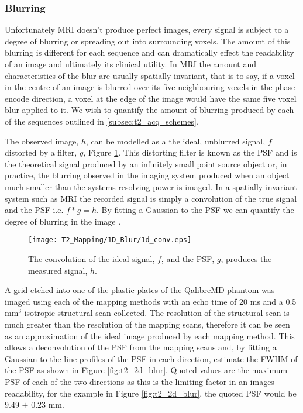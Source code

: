 \subsubsection{Blurring}
Unfortunately \ac{MRI} doesn't produce perfect images, every signal is subject to a degree of blurring or spreading out into surrounding voxels. The amount of this blurring is different for each sequence and can dramatically effect the readability of an image and ultimately its clinical utility. In \ac{MRI} the amount and characteristics of the blur are usually spatially invariant, that is to say, if a voxel in the centre of an image is blurred over its five neighbouring voxels in the phase encode direction, a voxel at the edge of the image would have the same five voxel blur applied to it. We wish to quantify the amount of blurring produced by each of the sequences outlined in \ref{subsec:t2_acq_schemes}.

The observed image, $h$, can be modelled as a the ideal, unblurred signal, $f$ distorted by a filter, $g$, Figure \ref{fig:t2_1d_blur}. This distorting filter is known as the \ac{PSF} and is the theoretical signal produced by an infinitely small point source object or, in practice, the blurring observed in the imaging system produced when an object much smaller than the systems resolving power is imaged. In a spatially invariant system such as \ac{MRI} the recorded signal is simply a convolution of the true signal and the \ac{PSF} i.e. $f \ast g = h$. By fitting a Gaussian to the \ac{PSF} we can quantify the degree of blurring in the image \cite{chaimow_more_2017, chaimow_more_2017-1}. 
\begin{figure}[H]
	\centering
	\texttt{[image: T2\_Mapping/1D\_Blur/1d\_conv.eps]}
	\caption{The convolution of the ideal signal, $f$, and the \ac{PSF}, $g$, produces the measured signal, $h$.}
	\label{fig:t2_1d_blur}	
\end{figure}

A grid etched into one of the plastic plates of the QalibreMD phantom was imaged using each of the \ttwo mapping methods with an echo time of 20 ms and a 0.5 mm$^3$ isotropic structural scan collected. The resolution of the structural scan is much greater than the resolution of the \ttwo mapping scans, therefore it can be seen as an approximation of the ideal image produced by each \ttwo mapping method. This allows a deconvolution of the \ac{PSF} from the \ttwo mapping scans and, by fitting a Gaussian to the line profiles of the \ac{PSF} in each direction, estimate the \ac{FWHM} of the \ac{PSF} as shown in Figure \ref{fig:t2_2d_blur}. Quoted values are the maximum \ac{PSF} of each of the two directions as this is the limiting factor in an images readability, for the example in Figure \ref{fig:t2_2d_blur}, the quoted \ac{PSF} would be 9.49 $\pm$ 0.23 mm.

